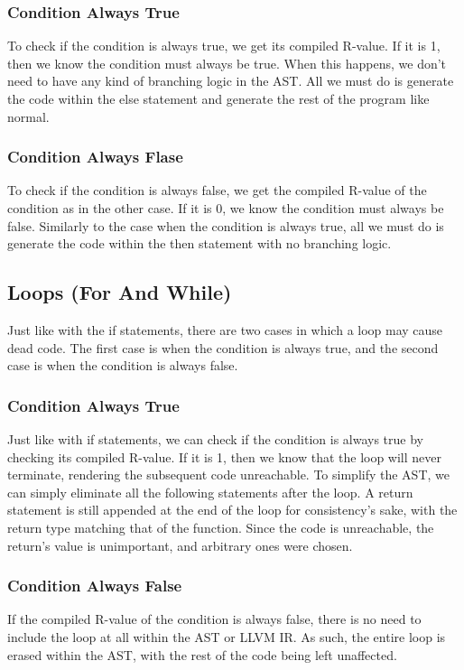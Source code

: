 \documentclass[sigconf]{acmart}
\begin{document}
\subsubsection{Condition Always True}
To check if the condition is always true, we get its compiled R-value. If it is 1, then we know 
the condition must always be true. When this happens, we don't need to have any kind of branching logic in the AST.
All we must do is generate the code within the else statement and generate the rest of the program like normal. 

\subsubsection{Condition Always Flase}
To check if the condition is always false, we get the compiled R-value of the condition as in the other case. If it is 0, we know 
the condition must always be false. Similarly to the case when the condition is always true, all we must do is generate the code within 
the then statement with no branching logic. 

\subsection{Loops (For And While)}
Just like with the if statements, there are two cases in which a loop may cause dead code. The first case is when the condition 
is always true, and the second case is when the condition is always false.

\subsubsection{Condition Always True}
Just like with if statements, we can check if the condition is always true by checking its compiled R-value.
If it is 1, then we know that the loop will never terminate, rendering the subsequent code unreachable. To simplify the AST, we can 
simply eliminate all the following statements after the loop. A return statement is still appended at the end of the loop for consistency's sake,
with the return type matching that of the function. Since the code is unreachable, the return's value is unimportant, and arbitrary
ones were chosen.

\subsubsection{Condition Always False}
If the compiled R-value of the condition is always false, there is no need to include the loop at all within the AST or LLVM IR. 
As such, the entire loop is erased within the AST, with the rest of the code being left unaffected.
\end{document}
